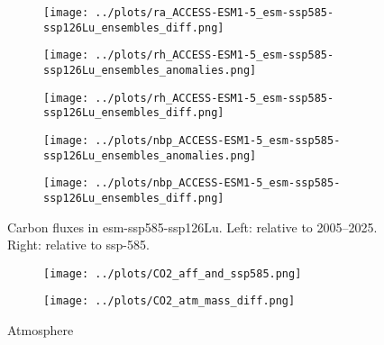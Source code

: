 \documentclass[]{article}
\begin{document}
\begin{figure}[H]
\begin{subfigure}[b]{0.4\linewidth}
    \end{subfigure}
    \begin{subfigure}[b]{0.4\linewidth}
        \texttt{[image: ../plots/ra\_ACCESS-ESM1-5\_esm-ssp585-ssp126Lu\_ensembles\_diff.png]}
    \end{subfigure}
    \begin{subfigure}[b]{0.4\linewidth}
        \texttt{[image: ../plots/rh\_ACCESS-ESM1-5\_esm-ssp585-ssp126Lu\_ensembles\_anomalies.png]}
    \end{subfigure}
    \begin{subfigure}[b]{0.4\linewidth}
        \texttt{[image: ../plots/rh\_ACCESS-ESM1-5\_esm-ssp585-ssp126Lu\_ensembles\_diff.png]}
    \end{subfigure}
    \begin{subfigure}[b]{0.4\linewidth}
        \texttt{[image: ../plots/nbp\_ACCESS-ESM1-5\_esm-ssp585-ssp126Lu\_ensembles\_anomalies.png]}
    \end{subfigure}
    \begin{subfigure}[b]{0.4\linewidth}
        \texttt{[image: ../plots/nbp\_ACCESS-ESM1-5\_esm-ssp585-ssp126Lu\_ensembles\_diff.png]}
    \end{subfigure}
    \caption{Carbon fluxes in esm-ssp585-ssp126Lu.  Left: relative to 2005–2025. Right: relative to ssp-585.}
    \label{fig:cflux}
\end{figure}

\begin{figure}
    \centering
    \begin{subfigure}[b]{0.4\linewidth}
        \texttt{[image: ../plots/CO2\_aff\_and\_ssp585.png]}
    \end{subfigure}
    \begin{subfigure}[b]{0.4\linewidth}
        \texttt{[image: ../plots/CO2\_atm\_mass\_diff.png]}
    \end{subfigure}
    \caption{Atmosphere}
    \label{fig:atmosphere_carbon}
\end{figure}
\end{document}
